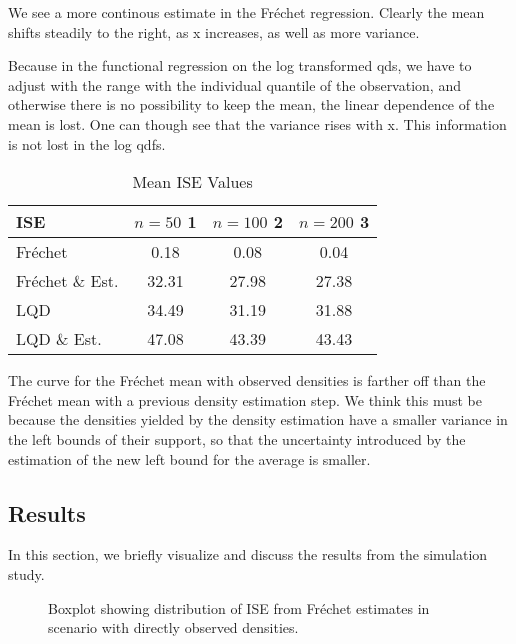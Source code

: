 We see a more continous estimate in the Fréchet regression. Clearly the mean shifts
steadily to the right, as x increases, as well as more variance.

Because in the functional regression on the log transformed qds, we have to adjust with
the range with the individual quantile of the observation, and otherwise there is no
possibility to keep the mean, the linear dependence of the mean is lost. One can though
see that the variance rises with x. This information is not lost in the log qdfs.

\begin{table}[h]
    \centering
    \begin{tabular}{lccc}
        \hline
        ISE & $n = 50$ 1 & $n = 100$ 2 & $n = 200$ 3 \\
        \hline
        Fréchet & 0.18 & 0.08 & 0.04 \\
        Fréchet \& Est. & 32.31 & 27.98 & 27.38 \\
        LQD & 34.49 & 31.19 & 31.88 \\
        LQD \& Est. & 47.08 & 43.39 & 43.43 \\
        \hline
    \end{tabular}
    \caption{Mean ISE Values}
\end{table}


The curve for the Fréchet mean with observed densities is farther off than the Fréchet
mean with a previous density estimation step. We think this must be because the densities
yielded by the density estimation have a smaller variance in the left bounds of their
support, so that the uncertainty introduced by the estimation of the new left bound for
the average is smaller.


\subsection{Results}
\label{sec:sim_results}

In this section, we briefly visualize and discuss the results from the simulation study.

\begin{figure}[h]
    \centering
    \resizebox{1\textwidth}{!}{}
    \caption[Simulation results: ISE boxplot --- Fréchet method with observed densities]{Boxplot showing distribution of
    ISE from Fréchet estimates in scenario with directly observed densities.}
    \label{fig:ise_frechet}
\end{figure}

